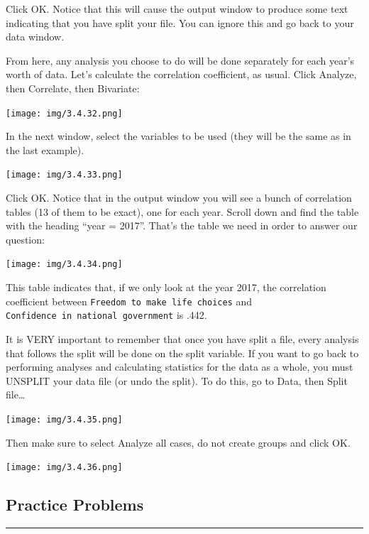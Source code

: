 \documentclass[
]{book}
\begin{document}
Click {OK}. Notice that this will cause the output window to produce some text indicating that you have split your file. You can ignore this and go back to your data window.

From here, any analysis you choose to do will be done separately for each year's worth of data. Let's calculate the correlation coefficient, as usual. Click {Analyze}, then {Correlate}, then {Bivariate}:

\texttt{[image: img/3.4.32.png]}

In the next window, select the variables to be used (they will be the same as in the last example).

\texttt{[image: img/3.4.33.png]}

Click {OK}. Notice that in the output window you will see a bunch of correlation tables (13 of them to be exact), one for each year. Scroll down and find the table with the heading ``year = 2017''. That's the table we need in order to answer our question:

\texttt{[image: img/3.4.34.png]}

This table indicates that, if we only look at the year 2017, the correlation coefficient between \texttt{Freedom\ to\ make\ life\ choices} and \texttt{Confidence\ in\ national\ government} is .442.

It is VERY important to remember that once you have split a file, every analysis that follows the split will be done on the split variable. If you want to go back to performing analyses and calculating statistics for the data as a whole, you must UNSPLIT your data file (or undo the split). To do this, go to {Data}, then {Split file\ldots{}}

\texttt{[image: img/3.4.35.png]}

Then make sure to select {Analyze all cases, do not create groups} and click {OK}.

\texttt{[image: img/3.4.36.png]}

\hypertarget{practice-problems-2}{%
\subsection{Practice Problems}\label{practice-problems-2}}

\begin{center}\rule{0.5\linewidth}{0.5pt}\end{center}
\end{document}
